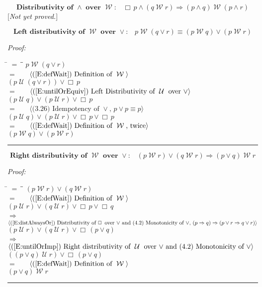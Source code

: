 \documentclass[fleqn, leqno]{article}
\newcommand{\lgap}{2pt}                             %
\newcommand{\mymathindent}{24pt}                    %
\newcommand{\impl}{\ensuremath{\Rightarrow}}        %
\newcommand{\Until}{\;\mathcal{U}\;}
\newcommand{\Wait}{\;\mathcal{W}\;}
\newcommand{\Always}{\Box\,}
\newcommand{\myqed}{\rule[-.23ex]{1.2ex}{2.0ex}}
\newcommand{\myqedtab}{\hspace{388.5pt}}              %
\newcommand{\Gll} {\langle}                         %
\newcommand{\Ggg} {\rangle}                         %
\newcommand{\Hint}[1]     {\ \ \ $\Gll              \mbox{#1} \Ggg$ }   %
\begin{document}
\begin{equation}\label{E:andWaitDist}
\textbf{Distributivity of $\land$ over $\Wait$:}\quad \Always p \land (q \Wait r) \impl (p \land q) \Wait (p \land r)
\end{equation}
[\textit{Not yet proved.}]

\begin{equation}\label{E:waitOrDist}
\textbf{Left distributivity of $\Wait$ over $\lor$:}\quad p \Wait (q \lor r) \equiv (p \Wait q) \lor (p \Wait r)
\end{equation}

\emph{Proof:}
\begin{tabbing}
\hspace{\mymathindent} \= $= \;$ \= \myqedtab \= \kill
\> \> $p \Wait (q \lor r)$\\[\lgap]
\> $=$ \> \Hint{(\ref{E:defWait}) Definition of $\Wait$} \\[\lgap]
\> \> $(p \Until (q \lor r)) \lor \Always p$\\[\lgap]
\> $=$ \> \Hint{(\ref{E:untilOrEquiv}) Left Distributivity of $\Until$ over $\lor$} \\[\lgap]
\> \> $(p \Until q) \lor (p \Until r) \lor \Always p$\\[\lgap]
\> $=$ \> \Hint{(3.26) Idempotency of $\lor$, $p \lor p \equiv p$} \\[\lgap]
\> \> $(p \Until q) \lor (p \Until r) \lor \Always p \lor \Always p$\\[\lgap]
\> $=$ \> \Hint{(\ref{E:defWait}) Definition of $\Wait$, twice} \\[\lgap]
\> \> $(p \Wait q) \lor (p \Wait r)$ \> \myqed
\end{tabbing}

\begin{equation}\label{E:rightWaitOrDist}
\textbf{Right distributivity of $\Wait$ over $\lor$:}\quad (p \Wait r) \lor (q \Wait r) \impl (p \lor q) \Wait r
\end{equation}

\emph{Proof:}
\begin{tabbing}
\hspace{\mymathindent} \= $= \;$ \= \myqedtab \= \kill
\> \> $(p \Wait r) \lor (q \Wait r)$\\[\lgap]
\> $=$ \> \Hint{(\ref{E:defWait}) Definition of $\Wait$} \\[\lgap]
\> \> $(p \Until r) \lor (q \Until r) \lor \Always p \lor \Always q$\\[\lgap]
\> $\impl$ \> \Hint{(\ref{E:distAlwaysOr}) Distributivity of $\Always$ over $\lor$ and (4.2) Monotonicity of $\lor$, $(p\impl q)\impl (p\lor r \impl q\lor r)$} \\[\lgap]
\> \> $(p \Until r) \lor (q \Until r) \lor \Always (p \lor q)$\\[\lgap]
\> $\impl$ \> \Hint{(\ref{E:untilOrImp}) Right distributivity of $\Until$ over $\lor$ and (4.2) Monotonicity of $\lor$} \\[\lgap]
\> \> $((p \lor q) \Until r) \lor \Always (p \lor q)$\\[\lgap]
\> $=$ \> \Hint{(\ref{E:defWait}) Definition of $\Wait$} \\[\lgap]
\> \> $(p \lor q) \Wait r$ \> \myqed
\end{tabbing}
\end{document}
